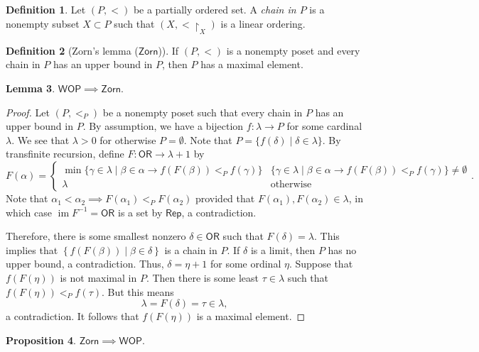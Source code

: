 \documentclass[10pt,letterpaper,cm]{nupset}
\theoremstyle{definition}
\newtheorem{definition}{Definition}[subsection]
\theoremstyle{theorem}
\newtheorem{lemma}[definition]{Lemma}
\newtheorem{prop}[definition]{Proposition}
\theoremstyle{remark}
\newcommand{\1}{\mathbf{1}}
\newcommand{\0}{\vec 0}
\newcommand{\ord}{\mathsf{OR}}
\DeclareMathOperator{\im}{im}
\begin{document}
\begin{definition}
Let $\left(P, <\right)$ be a partially ordered set. A \textit{chain in $P$} is a nonempty subset $X\subset P$ such that $\left(X, <\restriction_X\right)$ is a linear ordering. 
\end{definition}

\begin{definition}[Zorn's lemma ($\mathsf{Zorn}$)]
If $\left(P, <\right)$ is a nonempty poset and every chain in $P$ has an upper bound in $P$, then $P$ has a maximal element. 
\end{definition}

\begin{lemma}
$\mathsf{WOP} \implies \mathsf{Zorn}$.
\end{lemma}
\begin{proof} Let $\left(P, <_P\right)$ be a nonempty poset such that every chain in $P$ has an upper bound in $P$. By assumption, we have a bijection $f : \lambda \to P$ for some cardinal $\lambda$. We see that $\lambda >0$ for otherwise $P = \emptyset$. Note that $P = \{f(\delta) \mid \delta \in \lambda\}$. By transfinite recursion, define $F: \ord \to \lambda +1$ by
\[
F(\alpha) = \begin{cases}
\min\{\gamma \in \lambda \mid \beta \in \alpha \rightarrow f(F(\beta)) <_P f(\gamma)\} &\{\gamma \in \lambda \mid \beta \in \alpha \rightarrow f(F(\beta)) <_P f(\gamma)\} \ne \emptyset
\\ \lambda & \text{otherwise}
\end{cases}.
\]  Note that $\alpha_1 < \alpha _2 \implies F(\alpha_1) <_P F(\alpha_2)$ provided that $ F(\alpha_1),  F(\alpha_2) \in \lambda$, in which case $\im{F^{-1}}= \ord$ is a set by $\mathsf{Rep}$, a contradiction. 

\smallskip
Therefore, there is some smallest nonzero $\delta \in \ord$ such that $F(\delta) = \lambda$. This implies that $\left\{f(F(\beta)) \mid \beta \in \delta\right\}$ is a chain in $P$. If $\delta$ is a limit, then $P$ has no upper bound, a contradiction. Thus, $\delta = \eta + 1$ for some ordinal $\eta$. Suppose that $f(F(\eta))$ is not maximal in $P$. Then there is some least $\tau \in \lambda$ such that $f(F(\eta)) <_P f(\tau)$. But this means $$\lambda = F(\delta) = \tau \in \lambda,$$ a contradiction. It follows that $f(F(\eta))$ is a maximal element.  
\end{proof}

\begin{prop}
$\mathsf{Zorn} \implies \mathsf{WOP}$.
\end{prop}
\end{document}
